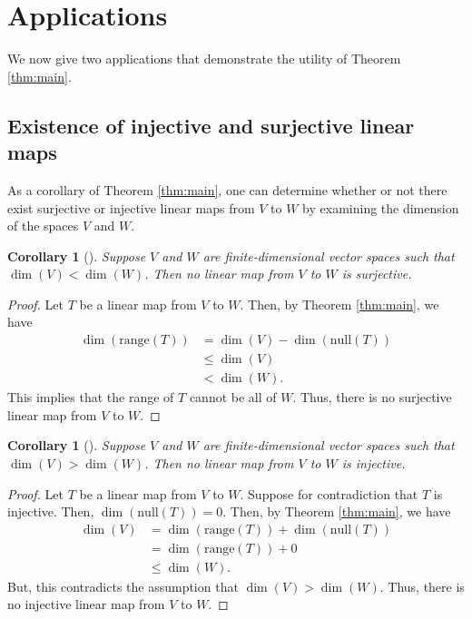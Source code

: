 \documentclass[11pt,reqno]{amsart}
\newtheorem{corollary}[theorem]{Corollary}
\theoremstyle{definition}
\newcommand{\nul}{\mathrm{null}}
\newcommand{\range}{\mathrm{range}}
\begin{document}
\section{Applications}
\label{sec:applications}

We now give two applications that demonstrate the utility of Theorem \ref{thm:main}.

\subsection{Existence of injective and surjective linear maps}

As a corollary of Theorem \ref{thm:main}, one can determine whether or not there exist surjective or injective linear maps from $V$ to $W$ by examining the dimension of the spaces $V$ and $W$.

\begin{corollary}[{\cite[3.24]{axler}}]
Suppose $V$ and $W$ are finite-dimensional vector spaces such that $\dim (V) < \dim (W)$. Then no linear map from $V$ to $W$ is surjective.
\end{corollary}
\begin{proof}
Let $T$ be a linear map from $V$ to $W$. Then, by Theorem \ref{thm:main}, we have
\begin{align*}
    \dim(\range(T)) &= \dim(V) - \dim(\nul(T))\\
    & \leq \dim (V) \\
    & < \dim (W).
\end{align*}
This implies that the range of $T$ cannot be all of $W$. Thus, there is no surjective linear map from $V$ to $W$.
\end{proof}


\begin{corollary}[{\cite[3.23]{axler}}]
\label{cor:noinj}
Suppose $V$ and $W$ are finite-dimensional vector spaces such that $\dim (V) > \dim (W)$. Then no linear map from $V$ to $W$ is injective.
\end{corollary}
\begin{proof}
Let $T$ be a linear map from $V$ to $W$. Suppose for contradiction that $T$ is injective. Then, $\dim(\nul(T)) = 0$. Then, by Theorem \ref{thm:main}, we have
\begin{align*}
    \dim(V) &= \dim(\range(T)) + \dim(\nul(T)) \\
    &= \dim(\range(T)) + 0 \\
    &\leq \dim(W).
\end{align*}
But, this contradicts the assumption that $\dim(V) > \dim(W)$. Thus, there is no injective linear map from $V$ to $W$.
\end{proof}
\end{document}

